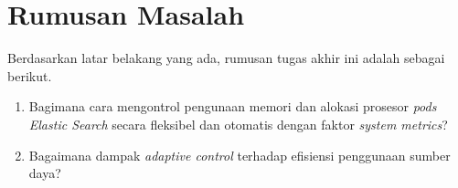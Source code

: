 \section{Rumusan Masalah}

Berdasarkan latar belakang yang ada, rumusan tugas akhir ini adalah sebagai berikut.
\begin{enumerate}
    \item Bagimana cara mengontrol pengunaan memori dan alokasi prosesor \textit{pods Elastic Search} secara fleksibel dan otomatis dengan faktor \textit{system metrics}?
    \item Bagaimana dampak \textit{adaptive control} terhadap efisiensi penggunaan sumber daya?
\end{enumerate}